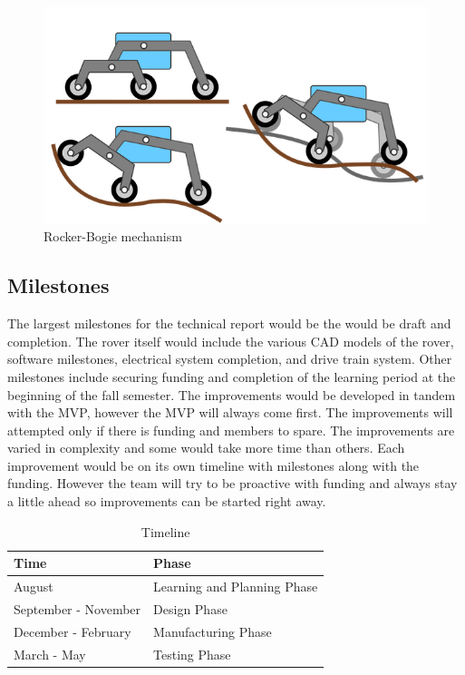 \documentclass[conference]{IEEEtran} %
\begin{document}
\begin{figure}[hb!]
  \includegraphics[width=\linewidth]{figs/rocker-bogie.png}
  \caption{Rocker-Bogie mechanism}
\label{fig:rockerbogie}
\end{figure}

\subsection{Milestones}
\label{subsec:milestones}
The largest milestones for the technical report would be the would be draft and completion. 
The rover itself would include the various CAD models of the rover, software milestones, electrical system completion, and drive train system. 
Other milestones include securing funding and completion of the learning period at the beginning of the fall semester.
The improvements would be developed in tandem with the MVP, however the MVP will always come first. 
The improvements will attempted only if there is funding and members to spare. 
The improvements are varied in complexity and some would take more time than others. 
Each improvement would be on its own timeline with milestones along with the funding.
However the team will try to be proactive with funding and always stay a little ahead so improvements can be started right away.

\begin{table}[ht!]
    \caption{Timeline}
    \centering
    {\renewcommand{\arraystretch}{1.5}
    \begin{tabularx}{\linewidth}{LL} 
    \hline
    \textbf{Time} & \textbf{Phase} \\
    \hline
    August & Learning and Planning Phase \\
    September - November & Design Phase  \\
    December - February & Manufacturing Phase \\
    March - May & Testing Phase \\
    \hline
    \end{tabularx}
    }
\label{tab:timeline}
\end{table}
\end{document}

